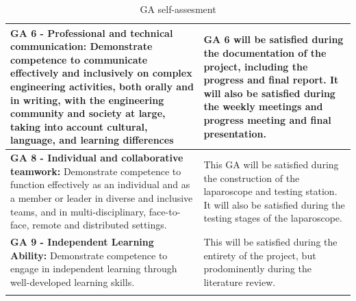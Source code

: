 \begin{longtable}{|p{}|p{}|}
\textbf{GA 6 - Professional and technical communication:} Demonstrate competence to communicate effectively and inclusively on complex engineering activities, both orally and in writing, with the engineering community and society at large, taking into account cultural, language, and learning differences
 & 
GA 6 will be satisfied during the documentation of the project, including the progress and final report. It will also be satisfied during the weekly meetings and progress meeting and final presentation. \\
\hline

\textbf{GA 8 - Individual and collaborative teamwork:} Demonstrate competence to function effectively as an individual and as a member or leader in diverse and inclusive teams, and in multi-disciplinary, face-to-face, remote and distributed settings.
& 
This GA will be satisfied during the construction of the laparoscope and testing station. It will also be satisfied during the testing stages of the laparoscope. \\
\hline

\textbf{ GA 9 - Independent Learning Ability:}  Demonstrate competence to engage in independent learning through well-developed learning skills.
& 
This will be satisfied during the entirety of the project, but prodominently during the literature review. \\
\hline


\caption{GA self-assesment}
\label{tab:longtable}
\end{longtable}